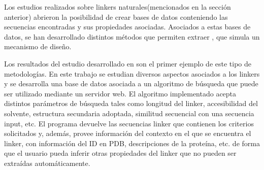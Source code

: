 











Los estudios realizados sobre linkers naturales(mencionados en la sección anterior) abrieron la posibilidad de crear bases de datos conteniendo las secuencias encontradas y sus propiedades asociadas.
Asociados a estas bases de datos, se han desarrollado distintos métodos que permiten extraer  ,  que simula un mecanismo de diseño.

Los resultados del estudio desarrollado en \cite{george2002analysis} son el primer ejemplo de este tipo de metodologías.
En este trabajo se estudian diversos aspectos asociados a los linkers y se desarrolla una base de datos asociada a un algoritmo de búsqueda que puede ser utilizado mediante un servidor web\cite{linkerdbIBIVU}.
El algoritmo implementado acepta distintos parámetros de búsqueda tales como longitud del linker, accesibilidad del solvente, estructura secundaria adoptada, similitud secuencial con una secuencia input, etc.
El programa devuelve las secuencias linker que contienen los criterios solicitados y, además, provee información del contexto en el que se encuentra el linker, con información del ID en PDB, descripciones de la proteína, etc. 
de forma que el usuario pueda inferir otras propiedades del linker que no pueden ser extraídas automáticamente.

